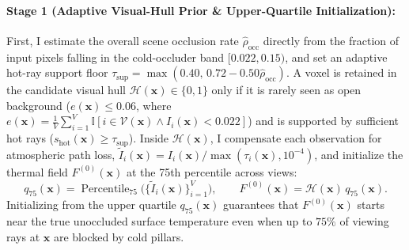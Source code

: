 \documentclass[12pt,letterpaper]{article}
\begin{document}
\paragraph{Stage 1 (Adaptive Visual-Hull Prior \& Upper-Quartile Initialization):}
First, I estimate the overall scene occlusion rate $\hat{\rho}_{\text{occ}}$ directly from the fraction of input pixels falling in the cold-occluder band $[0.022, 0.15)$, and set an adaptive hot-ray support floor $\tau_{\text{sup}} = \max(0.40,\, 0.72 - 0.50\hat{\rho}_{\text{occ}})$. A voxel is retained in the candidate visual hull $\mathcal{H}(\mathbf{x}) \in \{0, 1\}$ only if it is rarely seen as open background ($e(\mathbf{x}) \le 0.06$, where $e(\mathbf{x}) = \frac{1}{V}\sum_{i=1}^V \mathbb{I}[i \in \mathcal{V}(\mathbf{x}) \land I_i(\mathbf{x}) < 0.022]$) and is supported by sufficient hot rays ($s_{\text{hot}}(\mathbf{x}) \ge \tau_{\text{sup}}$). Inside $\mathcal{H}(\mathbf{x})$, I compensate each observation for atmospheric path loss, $\tilde{I}_i(\mathbf{x}) = I_i(\mathbf{x}) / \max(\tau_i(\mathbf{x}), 10^{-4})$, and initialize the thermal field $F^{(0)}(\mathbf{x})$ at the 75th percentile across views:
\begin{equation}
  q_{75}(\mathbf{x}) = \operatorname{Percentile}_{75}\!\Big(\big\{\tilde{I}_i(\mathbf{x})\big\}_{i=1}^V\Big), \qquad
  F^{(0)}(\mathbf{x}) = \mathcal{H}(\mathbf{x})\, q_{75}(\mathbf{x}).
  \label{eq:hull_prior}
\end{equation}
Initializing from the upper quartile $q_{75}(\mathbf{x})$ guarantees that $F^{(0)}(\mathbf{x})$ starts near the true unoccluded surface temperature even when up to $75\%$ of viewing rays at $\mathbf{x}$ are blocked by cold pillars.
\end{document}
